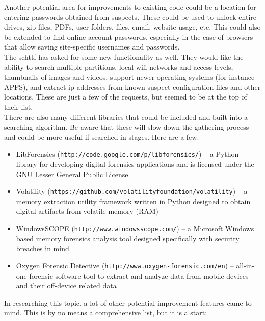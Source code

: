 \documentclass[12pt]{article}
\begin{document}
Another potential area for improvements to existing code could be a location for
entering passwords obtained from suspects.  These could be used to unlock entire
drives, zip files, PDFs, user folders, files, email, website usage, etc.  This
could also be extended to find online account passwords, especially in the case
of browsers that allow saving site-specific usernames and passwords.\\

The \gls{schttf} has asked for some new functionality as well.  They would like the
ability to search multiple partitions, local \gls{wifi} networks and access levels, 
thumbnails of images and videos, support newer operating systems (for instance APFS),
and extract \gls{ip} addresses from known suspect configuration files and 
other locations.  These are just a few of the requests, but seemed to be at
the top of their list.\\

There are also many different libraries that could be included and built
into a searching algorithm.  Be aware that these will slow down the gathering
process and could be more useful if searched in stages.  Here are a few:

\vspace{0.5 cm}
\begin{itemize}
  \item LibForensics ({\tt http://code.google.com/p/libforensics/}) --
  a Python library for developing digital forensics applications and
  is licensed under the GNU Lesser General Public License
  \item Volatility ({\tt https://github.com/volatilityfoundation/volatility}) --
  a memory extraction utility framework written in Python designed to
  obtain digital artifacts from volatile memory (RAM)
  \item WindowsSCOPE ({\tt http://www.windowsscope.com/}) -- 
  a Microsoft Windows\texttrademark\\
  based memory forensics analysis tool designed specifically with security breaches
  in mind
  \item Oxygen Forensic Detective ({\tt http://www.oxygen-forensic.com/en}) -- 
  all-in-one forensic software tool to extract and analyze data from mobile
  devices and their off-device related data
\end{itemize}
\vspace{0.5 cm}

In researching this topic, a lot of other potential improvement features
came to mind.  This is by no means a comprehensive list, but it is a start:
\end{document}
